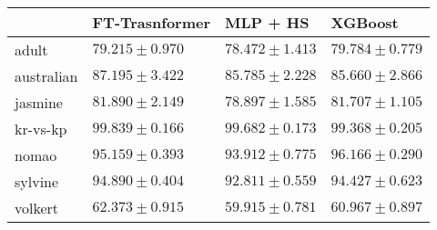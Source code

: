 \begin{tabular}{llll}
\toprule
 & FT-Trasnformer & MLP + HS & XGBoost \\
\midrule
adult & $79.215 \pm 0.970$ & $78.472 \pm 1.413$ & $79.784 \pm 0.779$ \\
australian & $87.195 \pm 3.422$ & $85.785 \pm 2.228$ & $85.660 \pm 2.866$ \\
jasmine & $81.890 \pm 2.149$ & $78.897 \pm 1.585$ & $81.707 \pm 1.105$ \\
kr-vs-kp & $99.839 \pm 0.166$ & $99.682 \pm 0.173$ & $99.368 \pm 0.205$ \\
nomao & $95.159 \pm 0.393$ & $93.912 \pm 0.775$ & $96.166 \pm 0.290$ \\
sylvine & $94.890 \pm 0.404$ & $92.811 \pm 0.559$ & $94.427 \pm 0.623$ \\
volkert & $62.373 \pm 0.915$ & $59.915 \pm 0.781$ & $60.967 \pm 0.897$ \\
\bottomrule
\end{tabular}
